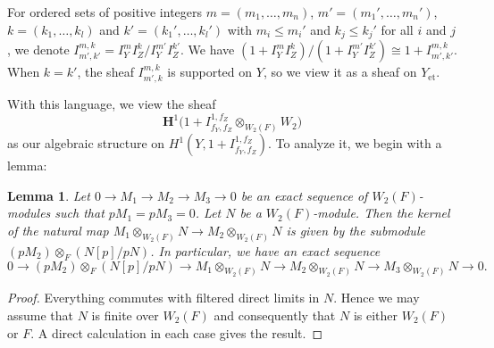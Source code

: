 \documentclass{amsart}
\newtheorem{Lem}[Thm]{Lemma}
\theoremstyle{remark}
\numberwithin{equation}{section}
\newcommand{\tensor}{\mathbin{\otimes}}
\newcommand{\et}{\mathrm{et}}
\newcommand{\alg}[1]{\mathbf{#1}}
\begin{document}
For ordered sets of positive integers $m = (m_{1}, \dots, m_{n})$,
$m' = (m_{1}', \dots, m_{n}')$,
$k = (k_{1}, \dots, k_{l})$ and
$k' = (k_{1}', \dots, k_{l}')$ with
$m_{i} \le m_{i}'$ and $k_{j} \le k_{j}'$ for all $i$ and $j$,
we denote $I^{m, k}_{m', k'} = I_{Y}^{m} I_{Z}^{k} / I_{Y}^{m'} I_{Z}^{k'}$.
We have $(1 + I_{Y}^{m} I_{Z}^{k}) / (1+ I_{Y}^{m'} I_{Z}^{k'}) \cong 1 + I^{m, k}_{m', k'}$.
When $k = k'$, the sheaf $I^{m, k}_{m', k}$ is supported on $Y$,
so we view it as a sheaf on $Y_{\et}$.

With this language, we view the sheaf
	\[
		\alg{H}^{1} \bigl(
				1
			+
				I^{1, f_{Z}}_{f_{Y}, f_{Z}}
			\tensor_{W_{2}(F)}
				W_{2}
		\bigr)
	\]
as our algebraic structure on $H^{1}(Y, 1 + I^{1, f_{Z}}_{f_{Y}, f_{Z}})$.
To analyze it, we begin with a lemma:

\begin{Lem} \label{0007}
	Let $0 \to M_{1} \to M_{2} \to M_{3} \to 0$ be an exact sequence of $W_{2}(F)$-modules
	such that $p M_{1} = p M_{3} = 0$.
	Let $N$ be a $W_{2}(F)$-module.
	Then the kernel of the natural map
	$M_{1} \tensor_{W_{2}(F)} N \to M_{2} \tensor_{W_{2}(F)} N$
	is given by the submodule $(p M_{2}) \tensor_{F} (N[p] / p N)$.
	In particular, we have an exact sequence
		\[
				0
			\to
				(p M_{2}) \tensor_{F} (N[p] / p N)
			\to
				M_{1} \tensor_{W_{2}(F)} N
			\to
				M_{2} \tensor_{W_{2}(F)} N
			\to
				M_{3} \tensor_{W_{2}(F)} N
			\to
				0.
		\]
\end{Lem}

\begin{proof}
	Everything commutes with filtered direct limits in $N$.
	Hence we may assume that $N$ is finite over $W_{2}(F)$
	and consequently that $N$ is either $W_{2}(F)$ or $F$.
	A direct calculation in each case gives the result.
\end{proof}
\end{document}
